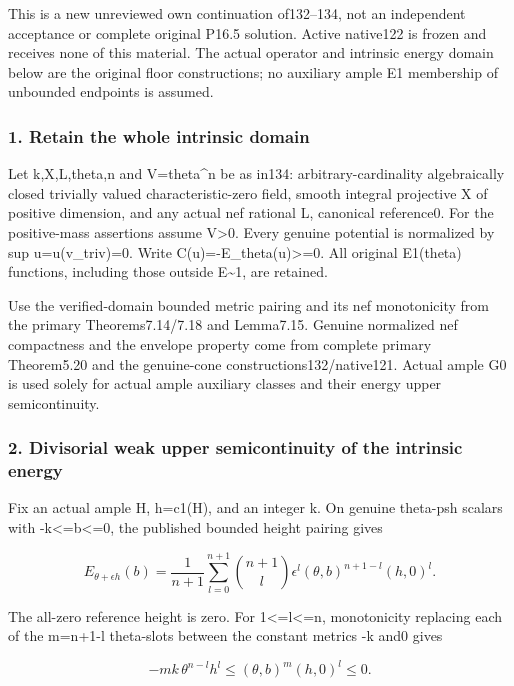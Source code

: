 \documentclass[
  10pt,
]{article}
\begin{document}
This is a new unreviewed own continuation of132--134, not an independent
acceptance or complete original P16.5 solution. Active native122 is
frozen and receives none of this material. The actual operator and
intrinsic energy domain below are the original floor constructions; no
auxiliary ample E1 membership of unbounded endpoints is assumed.

\subsubsection{1. Retain the whole intrinsic
domain}\label{retain-the-whole-intrinsic-domain}

Let k,X,L,theta,n and V=theta\^{}n be as in134: arbitrary-cardinality
algebraically closed trivially valued characteristic-zero field, smooth
integral projective X of positive dimension, and any actual nef rational
L, canonical reference0. For the positive-mass assertions assume
V\textgreater0. Every genuine potential is normalized by sup
u=u(v\_triv)=0. Write C(u)=-E\_theta(u)\textgreater=0. All original
E1(theta) functions, including those outside E\textasciitilde1, are
retained.

Use the verified-domain bounded metric pairing and its nef monotonicity
from the primary Theorems7.14/7.18 and Lemma7.15. Genuine normalized nef
compactness and the envelope property come from complete primary
Theorem5.20 and the genuine-cone constructions132/native121. Actual
ample G0 is used solely for actual ample auxiliary classes and their
energy upper semicontinuity.

\subsubsection{2. Divisorial weak upper semicontinuity of the intrinsic
energy}\label{divisorial-weak-upper-semicontinuity-of-the-intrinsic-energy}

Fix an actual ample H, h=c1(H), and an integer k. On genuine theta-psh
scalars with -k\textless=b\textless=0, the published bounded height
pairing gives

\[E_{\theta+\epsilon h}(b)
=\frac1{n+1}\sum_{l=0}^{n+1}\binom{n+1}l\epsilon^l
(\theta,b)^{n+1-l}(h,0)^l.\]

The all-zero reference height is zero. For 1\textless=l\textless=n,
monotonicity replacing each of the m=n+1-l theta-slots between the
constant metrics -k and0 gives

\[-mk\,\theta^{n-l}h^l
\le(\theta,b)^m(h,0)^l\le0.\]
\end{document}
